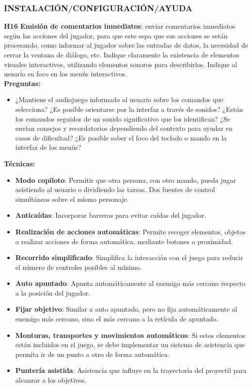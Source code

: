\subsubsection{INSTALACIÓN/CONFIGURACIÓN/AYUDA}

\textbf{H16  Emisión de comentarios inmediatos}: enviar comentarios inmediatos según las acciones del jugador, para que este sepa que sus acciones se están procesando, como informar al jugador sobre las entradas de datos, la necesidad de cerrar la ventana de diálogo, etc. Indique claramente la existencia de elementos visuales interactivos, utilizando elementos sonoros para describirlos. Indique al usuario su foco en los menús interactivos. \cite{deborbacamposUsabilityAccessibilityGameplay2016} \cite{WebContentAccessibility} \cite{teixeiraborgesFairPlayGuidelines2018a}\\
\textbf{Preguntas:}
\begin{itemize}
	\item ¿Mantiene el audiojuego informado al usuario sobre los comandos que selecciona? ¿Es posible orientarse por la interfaz a través de sonidos? ¿Están los comandos seguidos de un sonido significativo que los identifican? ¿Se envían consejos y recordatorios dependiendo del contexto para ayudar en casos de dificultad? ¿Es posible saber el foco del teclado o mando en la interfaz de los menús?
\end{itemize}
\textbf{Técnicas:}
\begin{itemize}
	\item \textbf{Modo copiloto}: Permitir que otra persona, con otro mando, pueda jugar asistiendo al usuario o dividiendo las tareas. Dos fuentes de control simultáneas sobre el mismo personaje. \cite{LibroBlancoAccesibilidad} 
	\item \textbf{Anticaídas}: Incorporar barreras para evitar caídas del jugador. \cite{LibroBlancoAccesibilidad} 
	\item \textbf{Realización de acciones automáticas}: Permite recoger elementos, objetos o realizar acciones de forma automática, mediante botones o proximidad.\cite{LibroBlancoAccesibilidad} 
	\item \textbf{Recorrido simplificado}: Simplifica la interacción con el juego para reducir el número de controles posibles al mínimo. \cite{LibroBlancoAccesibilidad} 
	\item \textbf{Auto apuntado}: Apunta automáticamente al enemigo más cercano respecto a la posición del jugador. \cite{LibroBlancoAccesibilidad} 
	\item \textbf{Fijar objetivo}: Similar a auto apuntado, pero no fija automáticamente al enemigo más cercano, sino el más cercano a la retícula de apuntado. \cite{LibroBlancoAccesibilidad} 
	\item \textbf{Monturas, transportes y movimientos automáticos}: Si estos elementos están incluidos en el juego, se debe implementar un sistema de asistencia que permita ir de un punto a otro de forma automática. \cite{LibroBlancoAccesibilidad} 
	\item \textbf{Puntería asistida}: Asistencia que influye en la trayectoria del proyectil para alcanzar a los objetivos.  \cite{LibroBlancoAccesibilidad} 
\end{itemize}
